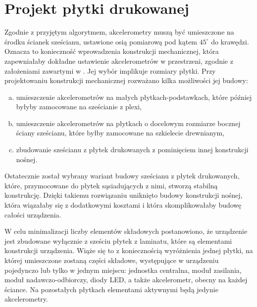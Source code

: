 	\section{Projekt płytki drukowanej}
Zgodnie z przyjętym algorytmem, akcelerometry muszą być umieszczone na środku ścianek sześcianu, ustawione osią pomiarową pod kątem $45^\circ$ do krawędzi. Oznacza to konieczność wprowadzenia konstrukcji mechanicznej, która zapewniałaby dokładne ustawienie akcelerometrów w przestrzeni, zgodnie z założeniami zawartymi w \cite{Tan00}. Jej wybór implikuje rozmiary płytki.
Przy projektowaniu konstrukcji mechanicznej rozważano kilka możliwości jej budowy:
	\begin{enumerate}[a)]
		\item umieszczenie akcelerometrów na małych płytkach-podstawkach, które później byłyby zamocowane na sześcianie z plexi,
		\item umieszczenie akcelerometrów na płytkach o docelowym rozmiarze bocznej ściany sześcianu, które byłby zamocowane na szkielecie drewnianym,
		\item zbudowanie sześcianu z płytek drukowanych z pominięciem innej konstrukcji nośnej.
	\end{enumerate}
Ostatecznie został wybrany wariant budowy sześcianu z płytek drukowanych, które, przymocowane do płytek sąsiadujących z nimi, stworzą stabilną konstrukcję. Dzięki takiemu rozwiązaniu uniknięto budowy konstrukcji nośnej, która wiązałaby się z dodatkowymi kosztami i która skomplikowałaby budowę całości urządzenia.

W celu minimalizacji liczby elementów składowych postanowiono, że urządzenie jest zbudowane wyłącznie z sześciu płytek z laminatu, które są elementami konstrukcji urządzenia. Wiąże się to z koniecznością wyróżnienia jednej płytki, na której umieszczone zostaną części składowe, występujące w urządzeniu pojedynczo lub tylko w jednym miejscu: jednostka centralna, moduł zasilania, moduł nadawczo-odbiorczy, diody LED, a także akcelerometr, obecny na każdej ściance. Na pozostałych płytkach elementami aktywnymi będą jedynie akcelerometry.

